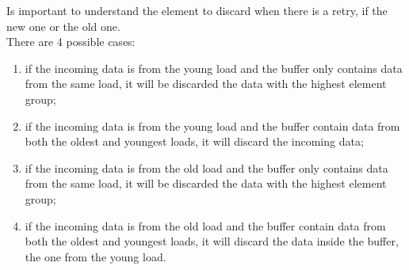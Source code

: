 Is important to understand the element to discard when there is a retry, if the new one or the old one.\\

There are 4 possible cases:
\begin{enumerate}
    \item if the incoming data is from the young load and the buffer only contains data from the same load, it will be discarded the data with the highest element group;
    
    \item if the incoming data is from the young load and the buffer contain data from both the oldest and youngest loads, it will discard the incoming data;
    
    \item if the incoming data is from the old load and the buffer only contains data from the same load, it will be discarded the data with the highest element group;
    
    \item if the incoming data is from the old load and the buffer contain data from both the oldest and youngest loads, it will discard the data inside the buffer, the one from the young load.
\end{enumerate}



